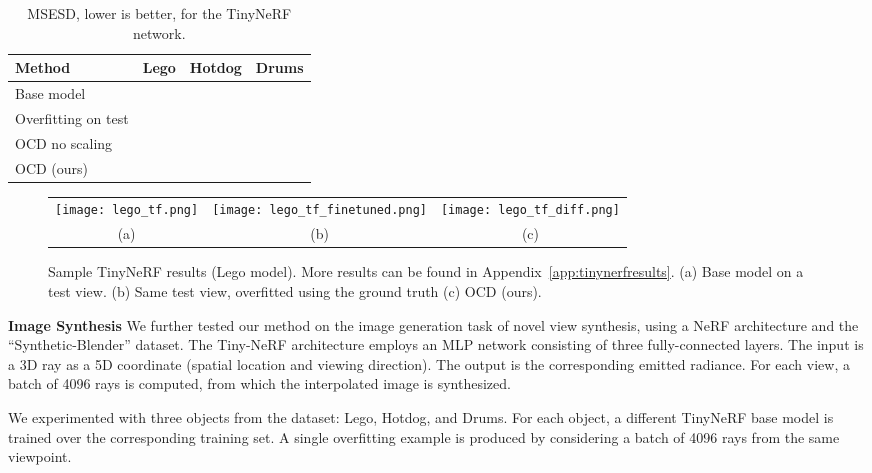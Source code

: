 \documentclass{article}
\theoremstyle{plain}
\begin{document}
\begin{table}[t]
\caption{MSESD, lower is better, for the TinyNeRF network.}
\label{tab:results_nerf}
\smallskip
\centering \begin{tabular}{@{}l@{~}c@{~}c@{~}c@{}} 
 \toprule
 Method & \multicolumn{1}{c}{Lego} & \multicolumn{1}{c}{Hotdog} &\multicolumn{1}{c}{Drums}\\
    \midrule
Base model & & &\\
{\color{shadecolor}Overfitting on test} & {\color{shadecolor} }& {\color{shadecolor}}& {\color{shadecolor}}\\
OCD no scaling  & & & \\
OCD (ours) & & & \\
 \bottomrule
\end{tabular}
\vspace{-.43cm}
\end{table}



\begin{figure*}[t]
\centering
  \begin{tabular}{@{}c@{~}c@{~}c@{}}
     \texttt{[image: lego\_tf.png]} & 
          \texttt{[image: lego\_tf\_finetuned.png]} &
     \texttt{[image: lego\_tf\_diff.png]}\\
     (a)&      (b)&     (c)\\
  \end{tabular}
    \caption{Sample TinyNeRF results (Lego model). More results can be found in Appendix~\ref{app:tinynerfresults}. (a) Base model on a test view. (b) Same test view, overfitted using the ground truth  (c) OCD (ours).}
    \label{fig:array_sample}
    \vspace{-.3cm}
\end{figure*}

{\bf Image Synthesis\quad} We further tested our method on the image generation task of novel view synthesis, using a NeRF architecture \citep{nerf} and the ``Synthetic-Blender'' dataset. The Tiny-NeRF architecture \citep{tinynerf} employs an MLP network consisting of three fully-connected layers. The input is a 3D ray as a 5D coordinate (spatial location and viewing direction). The output is the corresponding emitted radiance. For each view, a batch of 4096 rays is computed, from which the interpolated image is synthesized. 

We experimented with three objects from the dataset: Lego, Hotdog, and Drums. For each object, a different TinyNeRF base model is trained over the corresponding training set. A single overfitting example is produced by considering a batch of 4096 rays from the same viewpoint.
\end{document}
